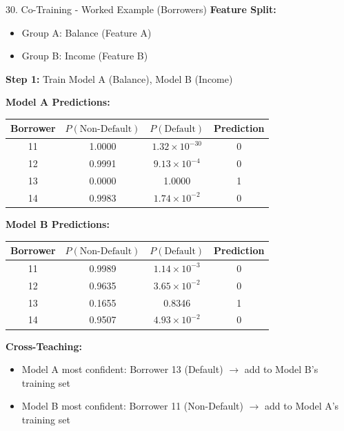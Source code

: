 \documentclass[8pt]{beamer}
\begin{document}
	\begin{frame}{30. Co-Training - Worked Example (Borrowers)}
		\fontsize{6.5}{7.5}\selectfont
		\textbf{Feature Split:}
		\begin{itemize}
			\item Group A: Balance (Feature A)
			\item Group B: Income (Feature B)
		\end{itemize}
		
		\textbf{Step 1:} Train Model A (Balance), Model B (Income)
		
		\textbf{Model A Predictions:}
		
		\begin{tabular}{|c|c|c|c|}
			\hline
			Borrower & $P(\text{Non-Default})$ & $P(\text{Default})$ & Prediction \\
			\hline
			11 & 1.0000 & $1.32 \times 10^{-30}$ & 0 \\
			12 & 0.9991 & $9.13 \times 10^{-4}$ & 0 \\
			13 & 0.0000 & 1.0000 & 1 \\
			14 & 0.9983 & $1.74 \times 10^{-2}$ & 0 \\
			\hline
		\end{tabular}
		
		\textbf{Model B Predictions:}
		
		\begin{tabular}{|c|c|c|c|}
			\hline
			Borrower & $P(\text{Non-Default})$ & $P(\text{Default})$ & Prediction \\
			\hline
			11 & 0.9989 & $1.14 \times 10^{-3}$ & 0 \\
			12 & 0.9635 & $3.65 \times 10^{-2}$ & 0 \\
			13 & 0.1655 & 0.8346 & 1 \\
			14 & 0.9507 & $4.93 \times 10^{-2}$ & 0 \\
			\hline
		\end{tabular}
		
		\textbf{Cross-Teaching:}
		\begin{itemize}
			\item Model A most confident: Borrower 13 (Default) $\rightarrow$ add to Model B's training set
			\item Model B most confident: Borrower 11 (Non-Default) $\rightarrow$ add to Model A's training set
		\end{itemize}
	\end{frame}
	
\end{document}
